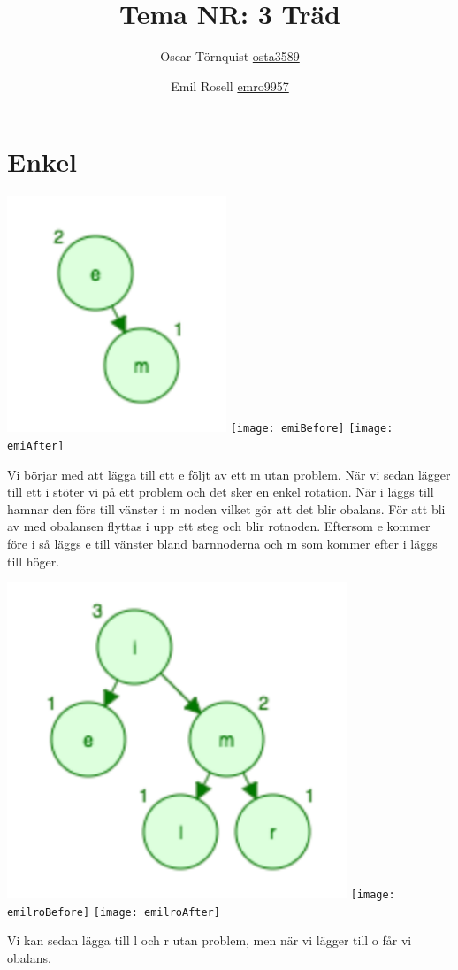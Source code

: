 \documentclass[a5paper,10pt,oneside]{article}
\title{Tema NR: 3 Träd}
\author{Oscar Törnquist \url{osta3589} \and Emil Rosell \url{emro9957}}
\begin{document}
\maketitle

\section*{Enkel}
\includegraphics[scale=0.7]{em}
\texttt{[image: emiBefore]}
\texttt{[image: emiAfter]}

Vi börjar med att lägga till ett e följt av ett m utan problem. När vi sedan lägger till ett i stöter vi på ett problem och det sker en enkel rotation. När  i läggs till hamnar den förs till vänster i m noden vilket gör att det blir obalans. För att bli av med obalansen flyttas i upp ett steg och blir rotnoden. Eftersom e kommer före i så läggs e till vänster bland barnnoderna och m som kommer efter i läggs till höger. 

\includegraphics[scale=0.45]{emilr}
\texttt{[image: emilroBefore]}
\texttt{[image: emilroAfter]}

Vi kan sedan lägga till l och r utan problem, men när vi lägger till o får vi obalans.
\end{document}
